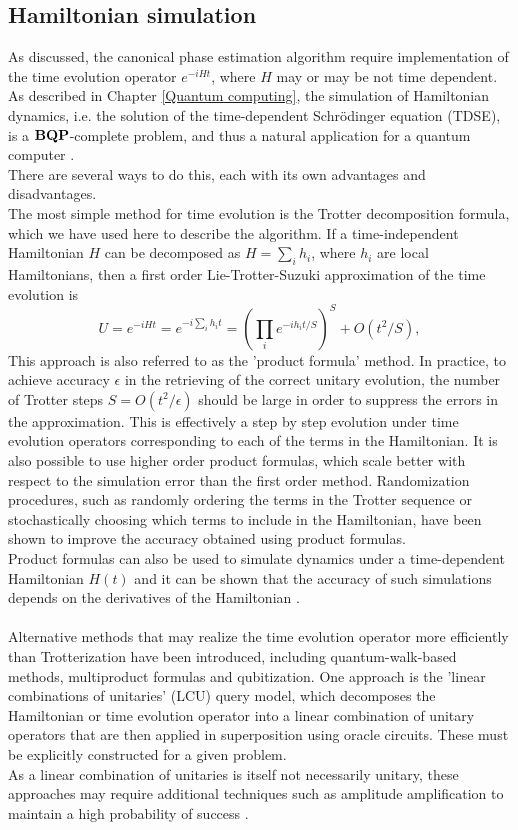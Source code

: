 \subsection{Hamiltonian simulation}
As discussed, the canonical phase estimation algorithm require implementation of the time evolution operator $e^{-iHt}$, where $H$ may or may be not time dependent. As described in Chapter \ref{Quantum computing}, the simulation of Hamiltonian dynamics, i.e. the solution of the time-dependent Schrödinger equation (TDSE), is a $\bf{BQP}$-complete problem, and thus a natural application for a quantum computer \cite{Motta2021Dec}. \\
There are several ways to do this, each with its own advantages and disadvantages. \\
The most simple method for time evolution is the Trotter decomposition formula, which we have used here to describe the algorithm. If a time-independent Hamiltonian $H$ can be decomposed as $H = \sum_i h_i$, where $h_i$ are local Hamiltonians, then a first order Lie-Trotter-Suzuki approximation of the time evolution is
\begin{equation}
    U = e^{-iHt} = e^{-i\sum_i h_i t} = \left( \prod_i e^{-i h_i t/S} \right)^S + O(t^2 / S),
\end{equation}
This approach is also referred to as the 'product formula' method. In practice, to achieve accuracy $\epsilon$ in the retrieving of the correct unitary evolution, the number of Trotter steps $S = O(t^2/\epsilon)$ should be large in order to suppress the errors in the approximation. This is effectively a step by step evolution under time evolution operators corresponding to each of the terms in the Hamiltonian. It is also possible to use higher order product formulas, which scale better with respect to the simulation error than the first order method. Randomization procedures, such as randomly ordering the terms in the Trotter sequence or stochastically choosing which terms to include in the Hamiltonian, have been shown to improve the accuracy obtained using product formulas. \\
Product formulas can also be used to simulate dynamics under a time-dependent Hamiltonian $H(t)$ and it can be shown that the accuracy of such simulations depends on the derivatives of the Hamiltonian \cite{Wiebe2011Oct}. \\
\\
Alternative methods that may realize the time evolution operator more efficiently than Trotterization have been introduced, including quantum-walk-based methods, multiproduct formulas and qubitization. One approach is the 'linear combinations of unitaries' (LCU) query model, which decomposes the Hamiltonian or time evolution operator into a linear combination of unitary operators that are then applied in superposition using oracle circuits. These must be explicitly constructed for a given problem. \\
As a linear combination of unitaries is itself not necessarily unitary, these approaches may require additional techniques such as amplitude amplification to maintain a high probability of success \cite{Motta2021Dec}.


